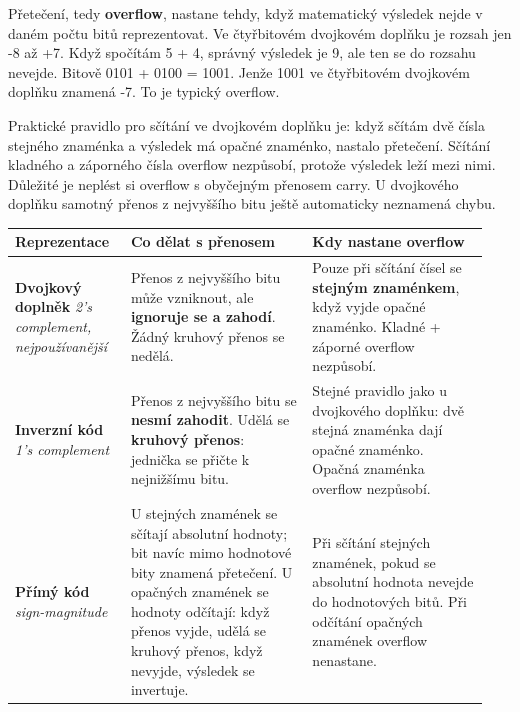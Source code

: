 Přetečení, tedy \textbf{overflow}, nastane tehdy, když matematický výsledek nejde v daném počtu bitů reprezentovat. Ve čtyřbitovém dvojkovém doplňku je rozsah jen -8 až +7. Když spočítám 5 + 4, správný výsledek je 9, ale ten se do rozsahu nevejde. Bitově 0101 + 0100 = 1001. Jenže 1001 ve čtyřbitovém dvojkovém doplňku znamená -7. To je typický overflow.

Praktické pravidlo pro sčítání ve dvojkovém doplňku je: když sčítám dvě čísla stejného znaménka a výsledek má opačné znaménko, nastalo přetečení. Sčítání kladného a záporného čísla overflow nezpůsobí, protože výsledek leží mezi nimi. Důležité je neplést si overflow s obyčejným přenosem carry. U dvojkového doplňku samotný přenos z nejvyššího bitu ještě automaticky neznamená chybu.


\begin{longtable}{p{0.23\linewidth}p{0.36\linewidth}p{0.35\linewidth}}
\toprule
\textbf{Reprezentace} & \textbf{Co dělat s přenosem} & \textbf{Kdy nastane overflow} \\
\midrule\endhead
\textbf{Dvojkový doplněk} \newline \emph{2's complement, nejpoužívanější}
& Přenos z nejvyššího bitu může vzniknout, ale \textbf{ignoruje se a zahodí}. Žádný kruhový přenos se nedělá.
& Pouze při sčítání čísel se \textbf{stejným znaménkem}, když vyjde opačné znaménko. Kladné + záporné overflow nezpůsobí. \\
\addlinespace
\textbf{Inverzní kód} \newline \emph{1's complement}
& Přenos z nejvyššího bitu se \textbf{nesmí zahodit}. Udělá se \textbf{kruhový přenos}: jednička se přičte k nejnižšímu bitu.
& Stejné pravidlo jako u dvojkového doplňku: dvě stejná znaménka dají opačné znaménko. Opačná znaménka overflow nezpůsobí. \\
\addlinespace
\textbf{Přímý kód} \newline \emph{sign-magnitude}
& U stejných znamének se sčítají absolutní hodnoty; bit navíc mimo hodnotové bity znamená přetečení. U opačných znamének se hodnoty odčítají: když přenos vyjde, udělá se kruhový přenos, když nevyjde, výsledek se invertuje.
& Při sčítání stejných znamének, pokud se absolutní hodnota nevejde do hodnotových bitů. Při odčítání opačných znamének overflow nenastane. \\
\bottomrule
\end{longtable}

